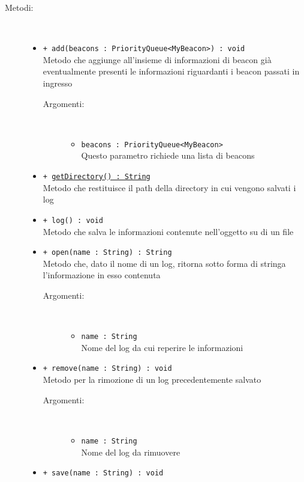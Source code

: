 \documentclass[../DefinizioneDiProdotto.tex]{subfiles}
\begin{document}
\begin{description}
\begin{itemize}
\end{itemize}
\item[Metodi:] \
\begin{itemize}
\item \texttt{+ add(beacons : PriorityQueue<MyBeacon>) : void}\\
Metodo che aggiunge all'insieme di informazioni di beacon già eventualmente presenti le informazioni riguardanti i beacon passati in ingresso
 \begin{description}
\item[Argomenti:] \
\begin{itemize}
\item \texttt{beacons : PriorityQueue<MyBeacon>}\\
Questo parametro richiede una lista di beacons\end{itemize}
\end{description}
\item \texttt{+ \underline{getDirectory() : String}}\\
Metodo che restituisce il path della directory in cui vengono salvati i log
 \item \texttt{+ log() : void}\\
Metodo che salva le informazioni contenute nell'oggetto su di un file
 \item \texttt{+ open(name : String) : String}\\
Metodo che, dato il nome di un log, ritorna sotto forma di stringa l'informazione in esso contenuta
 \begin{description}
\item[Argomenti:] \
\begin{itemize}
\item \texttt{name : String}\\
Nome del log da cui reperire le informazioni\end{itemize}
\end{description}
\item \texttt{+ remove(name : String) : void}\\
Metodo per la rimozione di un log precedentemente salvato
 \begin{description}
\item[Argomenti:] \
\begin{itemize}
\item \texttt{name : String}\\
Nome del log da rimuovere\end{itemize}
\end{description}
\item \texttt{+ save(name : String) : void}\\

\end{itemize}
\end{description}
\end{document}
